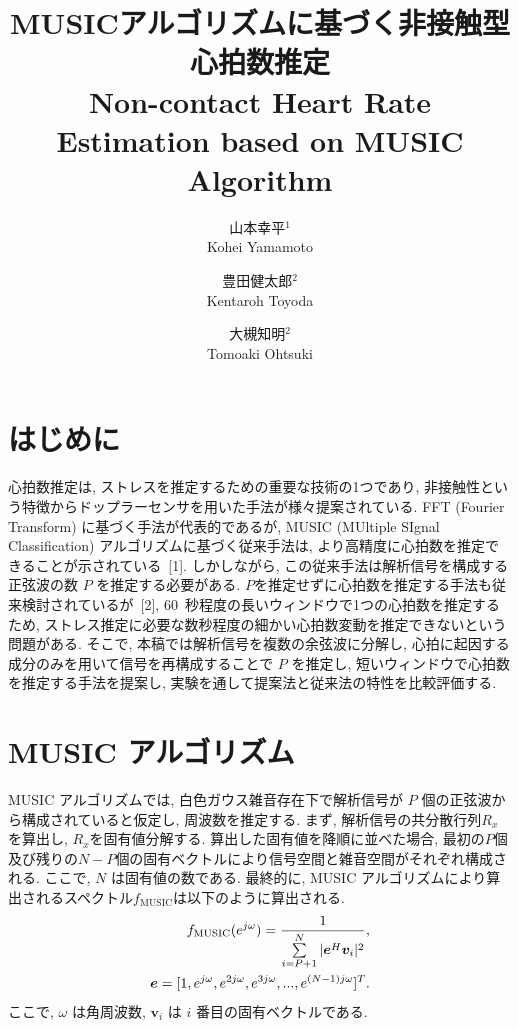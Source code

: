 \documentclass[twocolumn, a4paper]{ieicejsp}
\title{MUSICアルゴリズムに基づく非接触型心拍数推定
  {\normalsize \\ Non-contact Heart Rate Estimation based on MUSIC Algorithm}}
\author{
    山本幸平$^1$ \\ Kohei Yamamoto \and
    豊田健太郎$^2$\\ Kentaroh Toyoda \and
    大槻知明$^2$ \\ Tomoaki Ohtsuki \and
  }
\newcommand{\fmusic}{f_{\mathrm{MUSIC}}}
\begin{document}
\maketitle

{\small
\section{はじめに}
心拍数推定は, ストレスを推定するための重要な技術の1つであり, 非接触性という特徴からドップラーセンサを用いた手法が様々提案されている.
FFT (Fourier Transform) に基づく手法が代表的であるが, MUSIC (MUltiple SIgnal Classification) アルゴリズムに基づく従来手法は, より高精度に心拍数を推定できることが示されている~[1].
しかしながら, この従来手法は解析信号を構成する正弦波の数 $P$ を推定する必要がある.
$P$を推定せずに心拍数を推定する手法も従来検討されているが~[2], 60~秒程度の長いウィンドウで1つの心拍数を推定するため, ストレス推定に必要な数秒程度の細かい心拍数変動を推定できないという問題がある.
そこで, 本稿では解析信号を複数の余弦波に分解し, 心拍に起因する成分のみを用いて信号を再構成することで $P$ を推定し, 短いウィンドウで心拍数を推定する手法を提案し, 実験を通して提案法と従来法の特性を比較評価する.
\vspace{-0.2cm}
\section{MUSIC アルゴリズム}

MUSIC アルゴリズムでは, 白色ガウス雑音存在下で解析信号が $P$ 個の正弦波から構成されていると仮定し, 周波数を推定する.
まず, 解析信号の共分散行列$R_x$を算出し, $R_x$を固有値分解する.
算出した固有値を降順に並べた場合, 最初の$P$個及び残りの$N-P$個の固有ベクトルにより信号空間と雑音空間がそれぞれ構成される.
ここで, $N$ は固有値の数である.
最終的に, MUSIC アルゴリズムにより算出されるスペクトル$\fmusic$は以下のように算出される.
\vspace{-0.2cm}
\begin{eqnarray}
  \fmusic(e^{j\omega}) = \frac{1}{\sum \limits_{i=P+1}^{N}|\bm{e}^H\bm{v}_i|^2},\\
  \bm{e} = [1, e^{j\omega}, e^{2j\omega}, e^{3j\omega}, ..., e^{(N-1)j\omega}]^T.
    \vspace{-0.2cm}
\end{eqnarray}
ここで, $\omega$ は角周波数, $\bm{v}_i$ は $i$ 番目の固有ベクトルである.

\vspace{-0.2cm}
}
\end{document}
